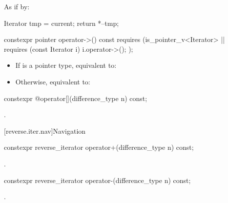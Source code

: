 \begin{itemdescr}
\pnum
\effects
As if by:
\begin{codeblock}
Iterator tmp = current;
return *--tmp;
\end{codeblock}
\end{itemdescr}

%
\begin{itemdecl}
constexpr pointer operator->() const
  requires (is_pointer_v<Iterator> ||
            requires (const Iterator i) { i.operator->(); });
\end{itemdecl}

\begin{itemdescr}
\pnum
\effects
\begin{itemize}
\item If  is a pointer type, equivalent to:

\item Otherwise, equivalent to:
\end{itemize}
\end{itemdescr}

%
\begin{itemdecl}
constexpr @\unspec@ operator[](difference_type n) const;
\end{itemdecl}

\begin{itemdescr}
\pnum
\returns
{}.
\end{itemdescr}

[reverse.iter.nav]{Navigation}

%
\begin{itemdecl}
constexpr reverse_iterator operator+(difference_type n) const;
\end{itemdecl}

\begin{itemdescr}
\pnum
\returns
{}.
\end{itemdescr}

%
\begin{itemdecl}
constexpr reverse_iterator operator-(difference_type n) const;
\end{itemdecl}

\begin{itemdescr}
\pnum
\returns
{}.
\end{itemdescr}

